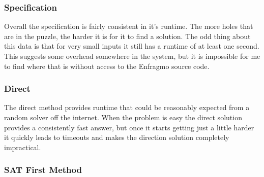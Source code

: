 \documentclass[11pt]{article} %
\begin{document}

\subsubsection{Specification}

Overall the specification is fairly consistent in it's runtime. The more holes that are in the puzzle, the harder it is for it to find a solution. The odd thing about this data is that for very small inputs it still has a runtime of at least one second. This suggests some overhead somewhere in the system, but it is impossible for me to find where that is without access to the Enfragmo source code.

\subsubsection{Direct}

The direct method provides runtime that could be reasonably expected from a random solver off the internet. When the problem is easy the direct solution provides a consistently fast answer, but once it starts getting just a little harder it quickly leads to timeouts and makes the direction solution completely impractical.

\subsubsection{SAT First Method}
\end{document}
